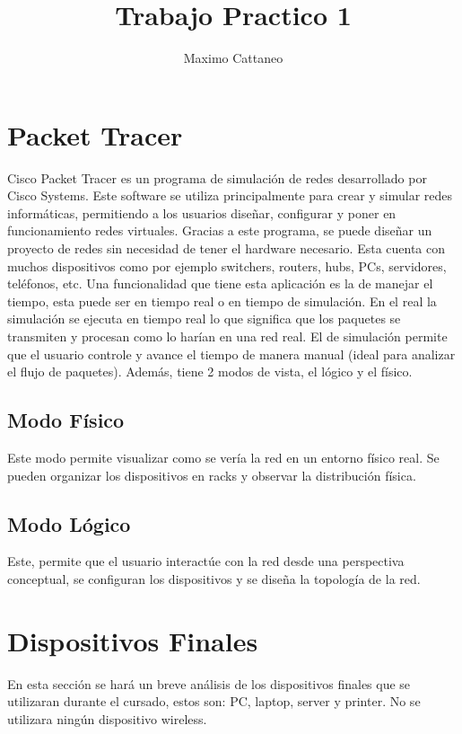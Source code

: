 \documentclass{article}
\title{Trabajo Practico 1}
\author{Maximo Cattaneo}
\affil{\texttt{cattaneomaxi@gmail.com}}
\begin{document}
\maketitle



\section{Packet Tracer}
Cisco Packet Tracer es un programa de simulación de redes desarrollado por Cisco Systems. Este software se utiliza principalmente para crear y simular redes informáticas, permitiendo a los usuarios diseñar, configurar y poner en funcionamiento redes virtuales. Gracias a este programa, se puede diseñar un proyecto de redes sin necesidad de tener el hardware necesario. Esta cuenta con muchos dispositivos como por ejemplo switchers, routers, hubs, PCs, servidores, teléfonos, etc. Una funcionalidad que tiene esta aplicación es la de manejar el tiempo, esta puede ser en tiempo real o en tiempo de simulación. En el real la simulación se ejecuta en tiempo real lo que significa que los paquetes se transmiten y procesan como lo harían en una red real. El de simulación permite que el usuario controle y avance el tiempo de manera manual (ideal para analizar el flujo de paquetes). Además, tiene 2 modos de vista, el lógico y el físico. 

\subsection{Modo Físico}
Este modo permite visualizar como se vería la red en un entorno físico real. Se pueden organizar los dispositivos en racks y observar la distribución física.

\subsection{Modo Lógico}
Este, permite que el usuario interactúe con la red desde una perspectiva conceptual, se configuran los dispositivos y se diseña la topología de la red.

\section{Dispositivos Finales}
En esta sección se hará un breve análisis de los dispositivos finales que se utilizaran durante el cursado, estos son: PC, laptop, server y printer. No se utilizara ningún dispositivo wireless.
\end{document}
